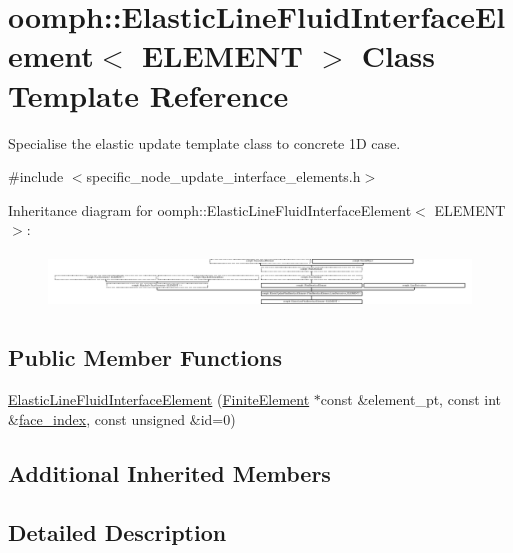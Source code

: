 \hypertarget{classoomph_1_1ElasticLineFluidInterfaceElement}{}\section{oomph\+:\+:Elastic\+Line\+Fluid\+Interface\+Element$<$ E\+L\+E\+M\+E\+NT $>$ Class Template Reference}
\label{classoomph_1_1ElasticLineFluidInterfaceElement}


Specialise the elastic update template class to concrete 1D case.  




{\ttfamily \#include $<$specific\+\_\+node\+\_\+update\+\_\+interface\+\_\+elements.\+h$>$}

Inheritance diagram for oomph\+:\+:Elastic\+Line\+Fluid\+Interface\+Element$<$ E\+L\+E\+M\+E\+NT $>$\+:\begin{figure}[H]
\begin{center}
\leavevmode
\includegraphics[height=1.471103cm]{classoomph_1_1ElasticLineFluidInterfaceElement}
\end{center}
\end{figure}
\subsection*{Public Member Functions}
\begin{DoxyCompactItemize}
\item 
\hyperlink{classoomph_1_1ElasticLineFluidInterfaceElement_ab0dde23477404e1c97956e40cfe361ab}{Elastic\+Line\+Fluid\+Interface\+Element} (\hyperlink{classoomph_1_1FiniteElement}{Finite\+Element} $\ast$const \&element\+\_\+pt, const int \&\hyperlink{classoomph_1_1FaceElement_a478d577ac6db67ecc80f1f02ae3ab170}{face\+\_\+index}, const unsigned \&id=0)
\end{DoxyCompactItemize}
\subsection*{Additional Inherited Members}


\subsection{Detailed Description}

